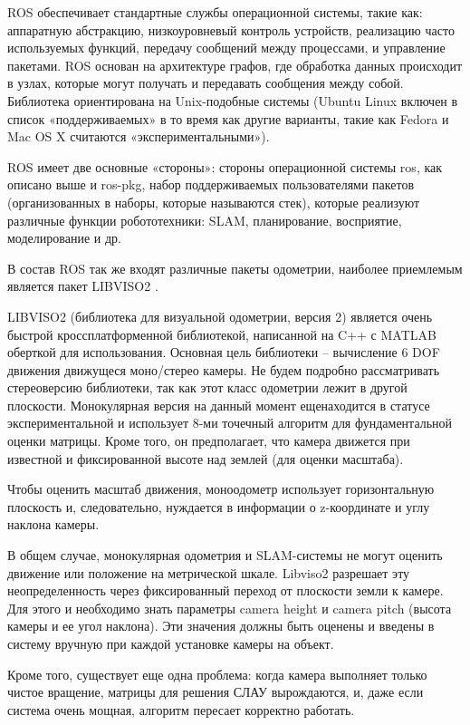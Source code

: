 ROS обеспечивает стандартные службы операционной системы, такие как: аппаратную абстракцию, низкоуровневый контроль устройств, реализацию часто используемых функций, передачу сообщений между процессами, и управление пакетами. ROS основан на архитектуре графов, где обработка данных происходит в узлах, которые могут получать и передавать сообщения между собой. Библиотека ориентирована на Unix-подобные системы (Ubuntu Linux включен в список «поддерживаемых» в то время как другие варианты, такие как Fedora и Mac OS X считаются «экспериментальными»).

ROS имеет две основные «стороны»: стороны операционной системы ros, как описано выше и ros-pkg, набор поддерживаемых пользователями пакетов (организованных в наборы, которые называются стек), которые реализуют различные функции робототехники: SLAM, планирование, восприятие, моделирование и др.\cite{wikiROS}

В состав ROS так же входят различные пакеты одометрии, наиболее приемлемым является пакет LIBVISO2 \cite{libvis1}.

LIBVISO2 (библиотека для визуальной одометрии, версия 2) является очень быстрой кроссплатформенной библиотекой, написанной на C++ с MATLAB оберткой для использования. Основная цель библиотеки – вычисление 6 DOF движения движущеся моно/стерео камеры. Не будем подробно рассматривать стереоверсию библиотеки, так как этот класс одометрии лежит в другой плоскости. Монокулярная версия на данный момент ещенаходится в статусе экспериментальной и использует 8-ми точечный алгоритм для фундаментальной оценки матрицы. Кроме того, он предполагает, что камера движется при известной и фиксированной высоте над землей (для оценки масштаба). 

Чтобы оценить масштаб движения, моноодометр использует горизонтальную плоскость и, следовательно, нуждается в информации о z-координате и углу наклона камеры.

В общем случае, монокулярная одометрия и SLAM-системы не могут оценить движение или положение на метрической шкале. Libviso2 разрешает эту неопределенность через фиксированный переход от плоскости земли к камере. Для этого и необходимо знать параметры camera height и camera pitch (высота камеры и ее угол наклона). Эти значения должны быть оценены и введены в систему вручную при каждой установке камеры на объект\cite{libvis2}. 

Кроме того, существует еще одна проблема: когда камера выполняет только чистое вращение, матрицы для решения СЛАУ вырождаются, и, даже если система очень мощная, алгоритм пересает корректно работать.


